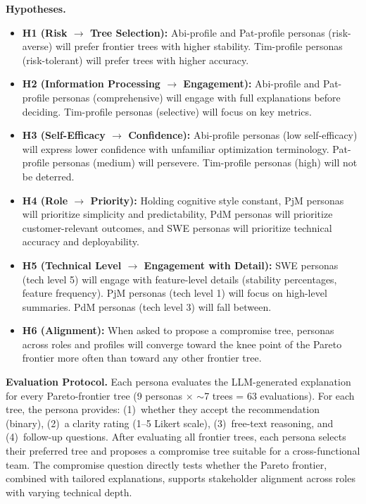 \documentclass[sigconf,review]{acmart}
\begin{document}
\textbf{Hypotheses.}

\begin{itemize}
    \item \textbf{H1 (Risk $\rightarrow$ Tree Selection):} 
    Abi-profile and Pat-profile personas (risk-averse) will prefer 
    frontier trees with higher stability. Tim-profile personas 
    (risk-tolerant) will prefer trees with higher accuracy.
    
    \item \textbf{H2 (Information Processing $\rightarrow$ 
    Engagement):} Abi-profile and Pat-profile personas 
    (comprehensive) will engage with full explanations before 
    deciding. Tim-profile personas (selective) will focus on key 
    metrics.
    
    \item \textbf{H3 (Self-Efficacy $\rightarrow$ Confidence):} 
    Abi-profile personas (low self-efficacy) will express lower 
    confidence with unfamiliar optimization terminology. Pat-profile 
    personas (medium) will persevere. Tim-profile personas (high) 
    will not be deterred.
    
    \item \textbf{H4 (Role $\rightarrow$ Priority):} Holding 
    cognitive style constant, PjM personas will prioritize 
    simplicity and predictability, PdM personas will prioritize 
    customer-relevant outcomes, and SWE personas will prioritize 
    technical accuracy and deployability.
    
    \item \textbf{H5 (Technical Level $\rightarrow$ Engagement 
    with Detail):} SWE personas (tech level 5) will engage with 
    feature-level details (stability percentages, feature frequency). 
    PjM personas (tech level 1) will focus on high-level summaries. 
    PdM personas (tech level 3) will fall between.
    
    \item \textbf{H6 (Alignment):} When asked to propose a 
    compromise tree, personas across roles and profiles will 
    converge toward the knee point of the Pareto frontier more 
    often than toward any other frontier tree.
\end{itemize}

\textbf{Evaluation Protocol.} Each persona evaluates the 
LLM-generated explanation for every Pareto-frontier tree 
(9 personas $\times$ $\sim$7 trees = 63 evaluations). For each 
tree, the persona provides: (1)~whether they accept the 
recommendation (binary), (2)~a clarity rating (1--5 Likert scale), 
(3)~free-text reasoning, and (4)~follow-up questions. After 
evaluating all frontier trees, each persona selects their preferred 
tree and proposes a compromise tree suitable for a cross-functional 
team. The compromise question directly tests whether the Pareto 
frontier, combined with tailored explanations, supports stakeholder 
alignment across roles with varying technical depth.
\end{document}
